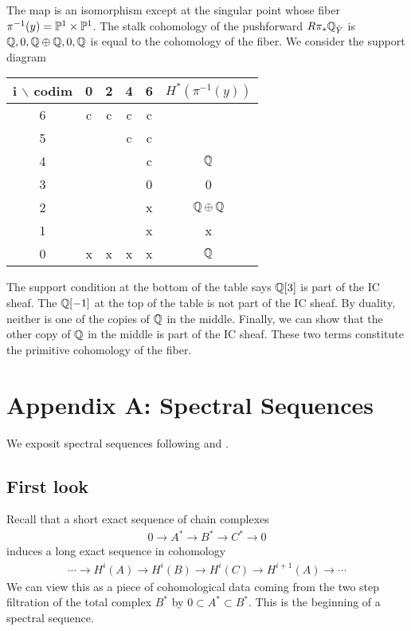 \documentclass[12pt]{article}
\begin{document}
The map is an isomorphism except at the singular point whose fiber $\pi^{-1}(y) = \P^1\times \P^1$. The stalk cohomology of the pushforward $R\pi_*\Q_{\tilde Y}$ is $\Q,0,\Q\oplus\Q,0,\Q$ is equal to the cohomology of the fiber. We consider the support diagram
\begin{center}
    \begin{tabular}{|c|c|c|c|c|c|}
        \hline
        i $\backslash$ codim & 0 & 2 & 4 & 6 & $H^*(\pi^{-1}(y))$ \\
        \hline
        6                    & c & c & c & c &                    \\
        \hline
        5                    &   &   & c & c &                    \\
        \hline
        4                    &   &   &   & c & $\Q$               \\
        \hline
        3                    &   &   &   & 0 & 0                  \\
        \hline
        2                    &   &   &   & x & $\Q\oplus\Q$       \\
        \hline
        1                    &   &   &   & x & x                  \\
        \hline
        0                    & x & x & x & x & $\Q$               \\
        \hline
    \end{tabular}
\end{center}
The support condition at the bottom of the table says $\Q[3]$ is part of the IC sheaf.
The $\Q[-1]$ at the top of the table is not part of the IC sheaf. By duality, neither is one of
the copies of $\Q$ in the middle. Finally, we can show that the other copy of $\Q$ in the middle
is part of the IC sheaf. These two terms constitute the primitive cohomology of the fiber.

\section{Appendix A: Spectral Sequences}
We exposit spectral sequences following \cite{griffiths-harris} and \cite{bott-tu}.
\subsection{First look}
Recall that a short exact sequence of chain complexes \begin{align*}
    0 \to A^* \to B^* \to C^* \to 0
\end{align*} induces a long exact sequence in cohomology \begin{align*}
    \cdots \to H^i(A) \to H^i(B) \to H^i(C) \to H^{i+1}(A) \to \cdots
\end{align*} We can view this as a piece of cohomological data coming from the
two step filtration of the total complex $B^*$ by $0 \subset A^* \subset B^*$.
This is the beginning of a spectral sequence.
\end{document}
